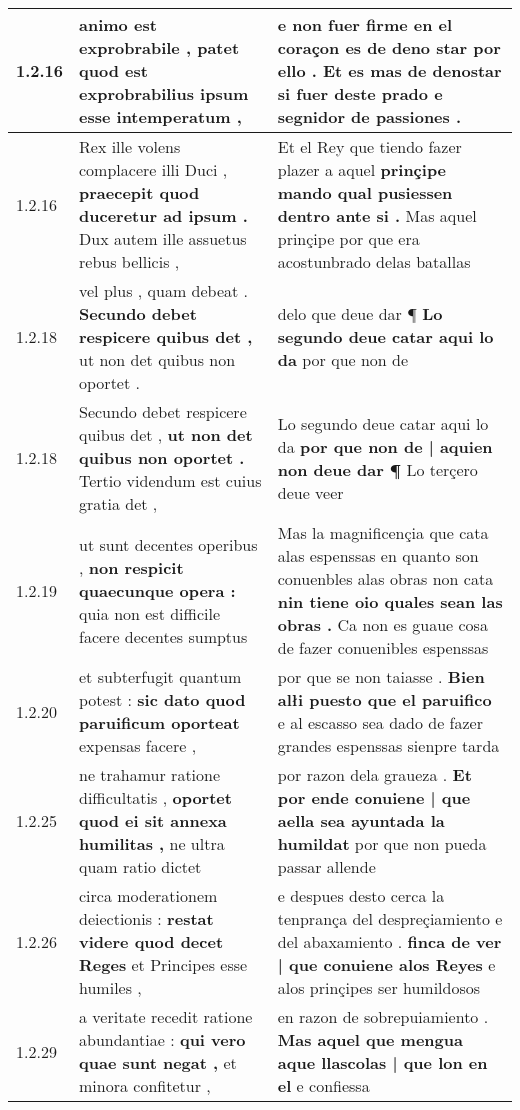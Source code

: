 \begin{tabular}{|p{1cm}|p{6.5cm}|p{6.5cm}|}
1.2.16 & animo est exprobrabile , \textbf{ patet quod est exprobrabilius } ipsum esse intemperatum , & e non fuer firme en el coraçon es de deno star por ello . \textbf{ Et es mas de denostar si fuer deste prado } e segnidor de passiones . \\\hline
1.2.16 & Rex ille volens complacere illi Duci , \textbf{ praecepit quod duceretur ad ipsum . } Dux autem ille assuetus rebus bellicis , & Et el Rey que tiendo fazer plazer a aquel \textbf{ prinçipe mando qual pusiessen dentro ante si . } Mas aquel prinçipe por que era acostunbrado delas batallas \\\hline
1.2.18 & vel plus , quam debeat . \textbf{ Secundo debet respicere quibus det , } ut non det quibus non oportet . & delo que deue dar ¶ \textbf{ Lo segundo deue catar aqui lo da } por que non de \\\hline
1.2.18 & Secundo debet respicere quibus det , \textbf{ ut non det quibus non oportet . } Tertio videndum est cuius gratia det , & Lo segundo deue catar aqui lo da \textbf{ por que non de | aquien non deue dar ¶ } Lo terçero deue veer \\\hline
1.2.19 & ut sunt decentes operibus , \textbf{ non respicit quaecunque opera : } quia non est difficile facere decentes sumptus & Mas la magnificençia que cata alas espenssas en quanto son conuenbles alas obras non cata \textbf{ nin tiene oio quales sean las obras . } Ca non es guaue cosa de fazer conuenibles espenssas \\\hline
1.2.20 & et subterfugit quantum potest : \textbf{ sic dato quod paruificum oporteat } expensas facere , & por que se non taiasse . \textbf{ Bien alłi puesto que el paruifico } e al escasso sea dado de fazer grandes espenssas sienpre tarda \\\hline
1.2.25 & ne trahamur ratione difficultatis , \textbf{ oportet quod ei sit annexa humilitas , } ne ultra quam ratio dictet & por razon dela graueza . \textbf{ Et por ende conuiene | que aella sea ayuntada la humildat } por que non pueda passar allende \\\hline
1.2.26 & circa moderationem deiectionis : \textbf{ restat videre quod decet Reges } et Principes esse humiles , & e despues desto cerca la tenprança del despreçiamiento e del abaxamiento . \textbf{ finca de ver | que conuiene alos Reyes } e alos prinçipes ser humildosos \\\hline
1.2.29 & a veritate recedit ratione abundantiae : \textbf{ qui vero quae sunt negat , } et minora confitetur , & en razon de sobrepuiamiento . \textbf{ Mas aquel que mengua aque llascolas | que lon en el } e confiessa \\\hline

\end{tabular}
